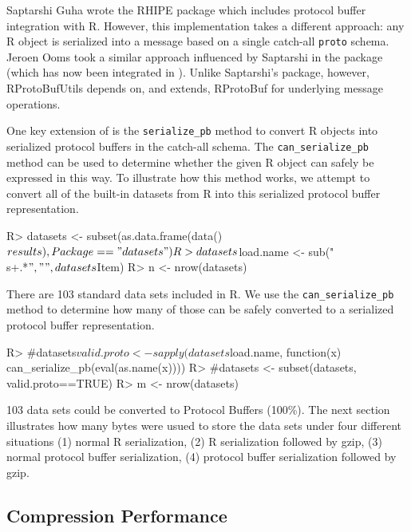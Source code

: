 \documentclass[article]{jss}
\begin{document}
Saptarshi Guha wrote the RHIPE package \citep{rhipe} which includes
protocol buffer integration with R.  However, this implementation
takes a different approach: any R object is serialized into a message
based on a single catch-all \texttt{proto} schema.  Jeroen Ooms took a
similar approach influenced by Saptarshi in the 
package (which has now been integrated in ).  Unlike
Saptarshi's package, however, RProtoBufUtils depends 
on, and extends, RProtoBuf for underlying message operations.  

One key extension of  is the 
\texttt{serialize\_pb} method to convert R objects into serialized
protocol buffers in the catch-all schema. The \texttt{can\_serialize\_pb}
method can be used to determine whether the given R object can safely
be expressed in this way.  To illustrate how this method works, we
attempt to convert all of the built-in datasets from R into this
serialized protocol buffer representation.

\begin{Schunk}
\begin{Sinput}
R> datasets <- subset(as.data.frame(data()$results), Package=="datasets")
R> datasets$load.name <- sub("\\s+.*$", "", datasets$Item)
R> n <- nrow(datasets)
\end{Sinput}
\end{Schunk}

There are 103 standard data sets included in R.  We use the
\texttt{can\_serialize\_pb} method to determine how many of those can
be safely converted to a serialized protocol buffer representation.

\begin{Schunk}
\begin{Sinput}
R> #datasets$valid.proto <- sapply(datasets$load.name, function(x) can_serialize_pb(eval(as.name(x))))
R> #datasets <- subset(datasets, valid.proto==TRUE)
R> m <- nrow(datasets)
\end{Sinput}
\end{Schunk}

103 data sets could be converted to Protocol Buffers
(100\%).  The next section illustrates how
many bytes were usued to store the data sets under four different
situations (1) normal R serialization, (2) R serialization followed by
gzip, (3) normal protocol buffer serialization, (4) protocol buffer
serialization followed by gzip.

\subsection{Compression Performance}
\label{sec:compression}
\end{document}
